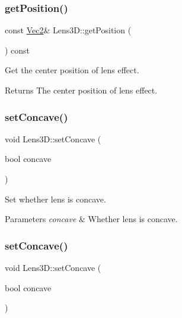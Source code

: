 \subsubsection{\texorpdfstring{get\+Position()}{getPosition()}\hspace{0.1cm}{\footnotesize\ttfamily [2/2]}}
{\footnotesize\ttfamily const \hyperlink{classVec2}{Vec2}\& Lens3\+D\+::get\+Position (\begin{DoxyParamCaption}{ }\end{DoxyParamCaption}) const\hspace{0.3cm}{\ttfamily [inline]}}



Get the center position of lens effect. 

\begin{DoxyReturn}{Returns}
The center position of lens effect. 
\end{DoxyReturn}
\mbox{\label{classLens3D_a76df2e34885baea1eb3e83506f71ac98}} 
\subsubsection{\texorpdfstring{set\+Concave()}{setConcave()}\hspace{0.1cm}{\footnotesize\ttfamily [1/2]}}
{\footnotesize\ttfamily void Lens3\+D\+::set\+Concave (\begin{DoxyParamCaption}\item[{bool}]{concave }\end{DoxyParamCaption})\hspace{0.3cm}{\ttfamily [inline]}}



Set whether lens is concave. 


\begin{DoxyParams}{Parameters}
{\em concave} & Whether lens is concave. \\
\hline
\end{DoxyParams}
\mbox{\label{classLens3D_a76df2e34885baea1eb3e83506f71ac98}} 
\subsubsection{\texorpdfstring{set\+Concave()}{setConcave()}\hspace{0.1cm}{\footnotesize\ttfamily [2/2]}}
{\footnotesize\ttfamily void Lens3\+D\+::set\+Concave (\begin{DoxyParamCaption}\item[{bool}]{concave }\end{DoxyParamCaption})\hspace{0.3cm}{\ttfamily [inline]}}



